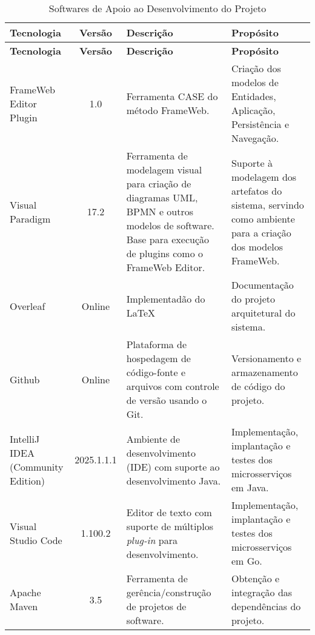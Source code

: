 \begin{footnotesize}
\begin{longtable}{|p{2.5cm}|c|p{5cm}|p{5.5cm}|}
	\caption{Softwares de Apoio ao Desenvolvimento do Projeto}	
	\label{tabela-software}\\\hline
	
	\rowcolor{lightgray}
	\textbf{Tecnologia} & \textbf{Versão} & \textbf{Descrição} & \textbf{Propósito} \\\hline 
	\endfirsthead
	\hline
	\rowcolor{lightgray}
	\textbf{Tecnologia} & \textbf{Versão} & \textbf{Descrição} & \textbf{Propósito} \\\hline 
	\endhead
	 
	FrameWeb Editor Plugin & 1.0 & Ferramenta CASE do método FrameWeb. & Criação dos modelos de Entidades, Aplicação, Persistência e Navegação. \\\hline
    
    Visual Paradigm & 17.2 & Ferramenta de modelagem visual para criação de diagramas UML, BPMN e outros modelos de software. Base para execução de plugins como o FrameWeb Editor. & Suporte à modelagem dos artefatos do sistema, servindo como ambiente para a criação dos modelos FrameWeb. \\\hline
	Overleaf  & Online & Implementadão do \LaTeX & Documentação do projeto arquitetural do sistema. \\\hline      

    Github  & Online & Plataforma de hospedagem de
código-fonte e arquivos com controle de versão usando o Git. & Versionamento e armazenamento de código do projeto. \\\hline  

	IntelliJ IDEA (Community Edition) & 2025.1.1.1 & Ambiente de desenvolvimento (IDE) com suporte ao desenvolvimento Java. & Implementação, implantação e testes dos microsserviços em Java. \\\hline

    Visual Studio Code & 1.100.2 & Editor de texto com suporte de múltiplos \textit{plug-in} para  desenvolvimento. & Implementação, implantação e testes dos microsserviços em Go. \\\hline
	
	Apache Maven & 3.5 & Ferramenta de gerência/construção de projetos de software. & Obtenção e integração das dependências do projeto. \\\hline
\end{longtable}
\end{footnotesize}
